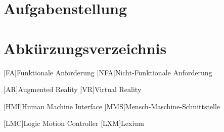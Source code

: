 \documentclass[12pt, a4paper, twoside]{article} %
\begin{document}
\section*{Aufgabenstellung}
\clearpage

\listoffigures
\clearpage

\listoftables
\clearpage

\section*{Abkürzungsverzeichnis}
\begin{acronym}[FA]
	[FA]{Funktionale Anforderung}
	[NFA]{Nicht-Funktionale Anforderung}
\end{acronym}
\begin{acronym}[VR]
	[AR]{Augmented Reality}
	[VR]{Virtual Reality}
\end{acronym}
\begin{acronym}[HMI]
	[HMI]{Human Machine Interface}
	[MMS]{Mensch-Maschine-Schnittstelle}
\end{acronym}
\begin{acronym}[LMC]
	[LMC]{Logic Motion Controller}
	[LXM]{Lexium}
\end{acronym}
\clearpage

\pagestyle{fancy}



\newpage


\newpage


\newpage


\newpage


\newpage


\newpage


\newpage


\newpage


\newpage

\end{document}
